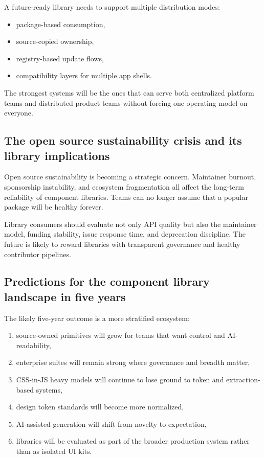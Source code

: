 A future-ready library needs to support multiple distribution modes:

\begin{itemize}[leftmargin=*, itemsep=0.35em]
  \item package-based consumption,
  \item source-copied ownership,
  \item registry-based update flows,
  \item compatibility layers for multiple app shells.
\end{itemize}

The strongest systems will be the ones that can serve both centralized platform teams and distributed product teams without forcing one operating model on everyone.

\subsection{The open source sustainability crisis and its library implications}
Open source sustainability is becoming a strategic concern. Maintainer burnout, sponsorship instability, and ecosystem fragmentation all affect the long-term reliability of component libraries. Teams can no longer assume that a popular package will be healthy forever.

Library consumers should evaluate not only API quality but also the maintainer model, funding stability, issue response time, and deprecation discipline. The future is likely to reward libraries with transparent governance and healthy contributor pipelines.

\subsection{Predictions for the component library landscape in five years}
The likely five-year outcome is a more stratified ecosystem:

\begin{enumerate}[leftmargin=*, itemsep=0.35em]
  \item source-owned primitives will grow for teams that want control and AI-readability,
  \item enterprise suites will remain strong where governance and breadth matter,
  \item CSS-in-JS heavy models will continue to lose ground to token and extraction-based systems,
  \item design token standards will become more normalized,
  \item AI-assisted generation will shift from novelty to expectation,
  \item libraries will be evaluated as part of the broader production system rather than as isolated UI kits.
\end{enumerate}

